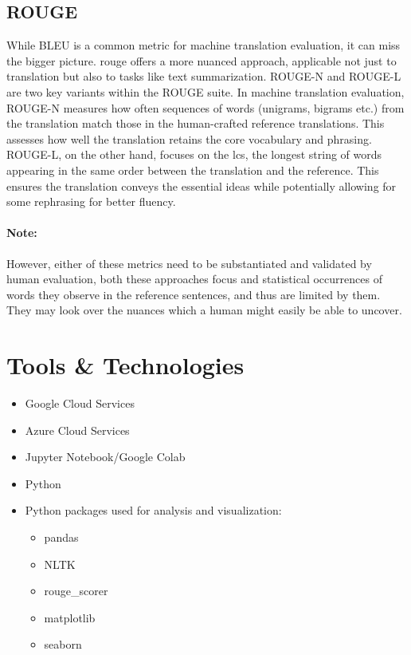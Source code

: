 \subsection{ROUGE}

While BLEU is a common metric for machine translation evaluation, it can miss the bigger picture. \gls{rouge} offers a more nuanced approach, applicable not just to translation but also to tasks like text summarization. ROUGE-N and ROUGE-L are two key variants within the ROUGE suite. In machine translation evaluation, ROUGE-N measures how often sequences of words (unigrams, bigrams etc.) from the translation match those in the human-crafted reference translations. This assesses how well the translation retains the core vocabulary and phrasing. ROUGE-L, on the other hand, focuses on the \gls{lcs}, the longest string of words appearing in the same order between the translation and the reference. This ensures the translation conveys the essential ideas while potentially allowing for some rephrasing for better fluency.

\paragraph{Note:} However, either of these metrics need to be substantiated and validated by human evaluation, both these approaches focus and statistical occurrences of words they observe in the reference sentences, and thus are limited by them. They may look over the nuances which a human might easily be able to uncover.

\section{Tools \& Technologies}

\begin{itemize}
    \item Google Cloud Services
    \item Azure Cloud Services
    \item Jupyter Notebook/Google Colab
    \item Python
    \item Python packages used for analysis and visualization:
    \begin{itemize}
        \item pandas
        \item NLTK
        \item rouge\_scorer
        \item matplotlib
        \item seaborn
    \end{itemize}
\end{itemize}